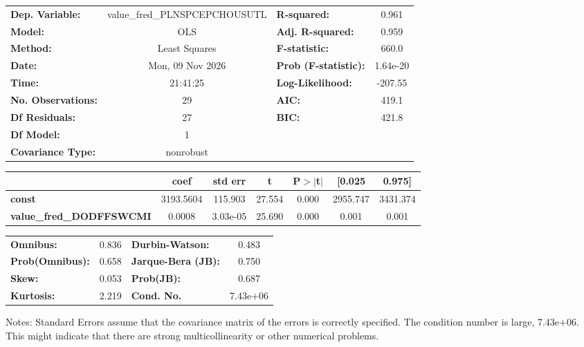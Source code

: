 \begin{center}
\begin{tabular}{lclc}
\toprule
\textbf{Dep. Variable:}          & value\_fred\_PLNSPCEPCHOUSUTL & \textbf{  R-squared:         } &     0.961   \\
\textbf{Model:}                  &              OLS              & \textbf{  Adj. R-squared:    } &     0.959   \\
\textbf{Method:}                 &         Least Squares         & \textbf{  F-statistic:       } &     660.0   \\
\textbf{Date:}                   &        Mon, 09 Nov 2026       & \textbf{  Prob (F-statistic):} &  1.64e-20   \\
\textbf{Time:}                   &            21:41:25           & \textbf{  Log-Likelihood:    } &   -207.55   \\
\textbf{No. Observations:}       &                 29            & \textbf{  AIC:               } &     419.1   \\
\textbf{Df Residuals:}           &                 27            & \textbf{  BIC:               } &     421.8   \\
\textbf{Df Model:}               &                  1            & \textbf{                     } &             \\
\textbf{Covariance Type:}        &           nonrobust           & \textbf{                     } &             \\
\bottomrule
\end{tabular}
\begin{tabular}{lcccccc}
                                 & \textbf{coef} & \textbf{std err} & \textbf{t} & \textbf{P$> |$t$|$} & \textbf{[0.025} & \textbf{0.975]}  \\
\midrule
\textbf{const}                   &    3193.5604  &      115.903     &    27.554  &         0.000        &     2955.747    &     3431.374     \\
\textbf{value\_fred\_DODFFSWCMI} &       0.0008  &     3.03e-05     &    25.690  &         0.000        &        0.001    &        0.001     \\
\bottomrule
\end{tabular}
\begin{tabular}{lclc}
\textbf{Omnibus:}       &  0.836 & \textbf{  Durbin-Watson:     } &    0.483  \\
\textbf{Prob(Omnibus):} &  0.658 & \textbf{  Jarque-Bera (JB):  } &    0.750  \\
\textbf{Skew:}          &  0.053 & \textbf{  Prob(JB):          } &    0.687  \\
\textbf{Kurtosis:}      &  2.219 & \textbf{  Cond. No.          } & 7.43e+06  \\
\bottomrule
\end{tabular}
\end{center}

Notes: \newline
 [1] Standard Errors assume that the covariance matrix of the errors is correctly specified. \newline
 [2] The condition number is large, 7.43e+06. This might indicate that there are \newline
 strong multicollinearity or other numerical problems.